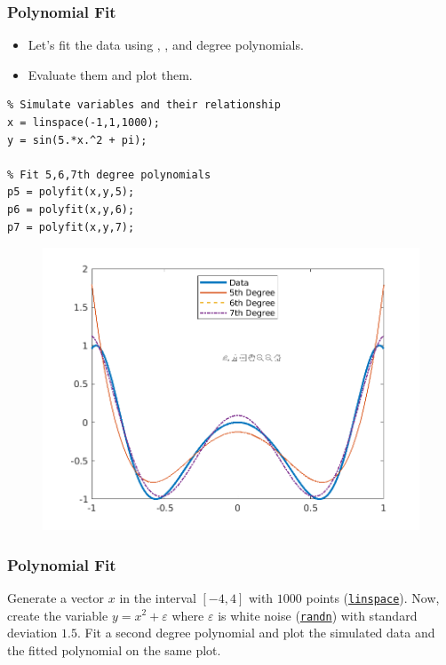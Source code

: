 \documentclass[11pt,xcolor={svgnames},aspectratio=169,usepdftitle=false]{beamer}
\begin{document}
\begin{frame}[fragile]
  \frametitle{Polynomial Fit}
  \begin{itemize}
    \item Let's fit the data using , , and  degree polynomials.
    \item Evaluate them and plot them.
  \end{itemize}

\begin{minipage}{0.45\textwidth}
\begin{lstlisting}
% Simulate variables and their relationship
x = linspace(-1,1,1000);
y = sin(5.*x.^2 + pi);
  
% Fit 5,6,7th degree polynomials
p5 = polyfit(x,y,5);
p6 = polyfit(x,y,6);
p7 = polyfit(x,y,7);
\end{lstlisting}
\end{minipage}
\begin{minipage}{0.45\textwidth}
\begin{figure}
  \centering
    \includegraphics[width = \textwidth]{../figures/poly_fit.png}
\end{figure}
\end{minipage}
\end{frame}

\begin{frame}
    \frametitle{Polynomial Fit}
\begin{exercise}
  Generate a vector $x$ in the interval $[-4,4]$ with $1000$ points (\href{https://www.mathworks.com/help/matlab/ref/linspace.html}{\normalfont \texttt{linspace}}). Now, create the variable $y = x^2 + \varepsilon$ where $\varepsilon$ is white noise (\href{https://www.mathworks.com/help/matlab/ref/randn.html}{\normalfont\texttt{randn}}) with standard  deviation $1.5$. Fit a second degree polynomial and plot the simulated data and the fitted polynomial on the same plot.
\end{exercise}
\end{frame}
\end{document}
